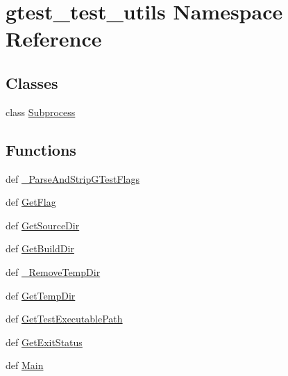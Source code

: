 \hypertarget{namespacegtest__test__utils}{\section{gtest\-\_\-test\-\_\-utils \-Namespace \-Reference}
\label{d2/d4a/namespacegtest__test__utils}
}
\subsection*{\-Classes}
\begin{DoxyCompactItemize}
\item 
class \hyperlink{classgtest__test__utils_1_1Subprocess}{\-Subprocess}
\end{DoxyCompactItemize}
\subsection*{\-Functions}
\begin{DoxyCompactItemize}
\item 
def \hyperlink{namespacegtest__test__utils_ad921ed375f15b035ca7419c0493b3463}{\-\_\-\-Parse\-And\-Strip\-G\-Test\-Flags}
\item 
def \hyperlink{namespacegtest__test__utils_a406e375483e21bcd8f6487467c70bf43}{\-Get\-Flag}
\item 
def \hyperlink{namespacegtest__test__utils_a61bdad46f079ed13d9102f8a8c13ea18}{\-Get\-Source\-Dir}
\item 
def \hyperlink{namespacegtest__test__utils_a69139a9ca084ed1cc641897636a57fad}{\-Get\-Build\-Dir}
\item 
def \hyperlink{namespacegtest__test__utils_ac4724db62e86d90347503275c853644d}{\-\_\-\-Remove\-Temp\-Dir}
\item 
def \hyperlink{namespacegtest__test__utils_a35879a886810d885b57577e813d3a333}{\-Get\-Temp\-Dir}
\item 
def \hyperlink{namespacegtest__test__utils_a1bdf3cac86afa675ed37629b183048e9}{\-Get\-Test\-Executable\-Path}
\item 
def \hyperlink{namespacegtest__test__utils_a8ff3a0bbcfecd0e0a8b3d102cb31f327}{\-Get\-Exit\-Status}
\item 
def \hyperlink{namespacegtest__test__utils_afffc1389d4e3b153f1a37715aced37a5}{\-Main}
\end{DoxyCompactItemize}

